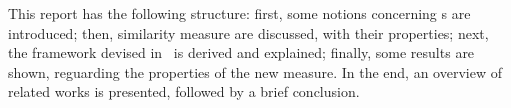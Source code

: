 This report has the following structure:
first, some notions concerning \dl{}s are introduced;
then, similarity measure are discussed, with their properties;
next, the framework devised in~\cite{LeTu12} is derived and explained;
finally, some results are shown, reguarding the properties of the new measure.
In the end, an overview of related works is presented, followed by a brief conclusion.
